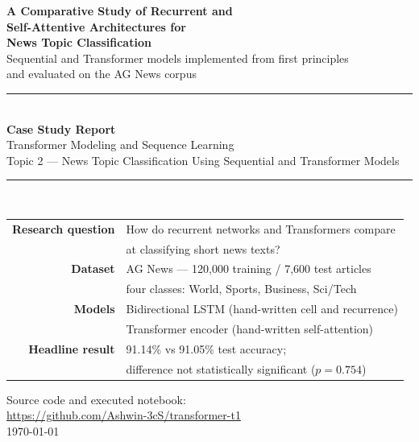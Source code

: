 \documentclass[11pt,a4paper,oneside]{report}
\begin{document}
\begin{titlepage}
\centering
\vspace*{0.6in}

{\Large\bfseries A Comparative Study of Recurrent and\\[6pt]
Self-Attentive Architectures for\\[6pt]
News Topic Classification}\\[10pt]

{\large Sequential and Transformer models implemented from first principles\\
and evaluated on the AG News corpus}\\[0.5in]

\rule{\textwidth}{0.8pt}\\[0.25in]

{\large\textbf{Case Study Report}}\\[6pt]
{\large Transformer Modeling and Sequence Learning}\\[6pt]
{\large Topic 2 --- News Topic Classification Using Sequential and Transformer Models}\\[0.3in]

\rule{\textwidth}{0.8pt}\\[0.5in]

\begin{tabular}{rl}
\textbf{Research question} & How do recurrent networks and Transformers compare\\
                           & at classifying short news texts?\\[8pt]
\textbf{Dataset}           & AG News --- 120{,}000 training / 7{,}600 test articles\\
                           & four classes: World, Sports, Business, Sci/Tech\\[8pt]
\textbf{Models}            & Bidirectional LSTM (hand-written cell and recurrence)\\
                           & Transformer encoder (hand-written self-attention)\\[8pt]
\textbf{Headline result}   & 91.14\% vs 91.05\% test accuracy;\\
                           & difference not statistically significant ($p = 0.754$)\\
\end{tabular}

\vfill
{\large Source code and executed notebook:}\\[4pt]
\url{https://github.com/Ashwin-3cS/transformer-t1}\\[0.3in]
{\large \today}
\end{titlepage}
\end{document}
